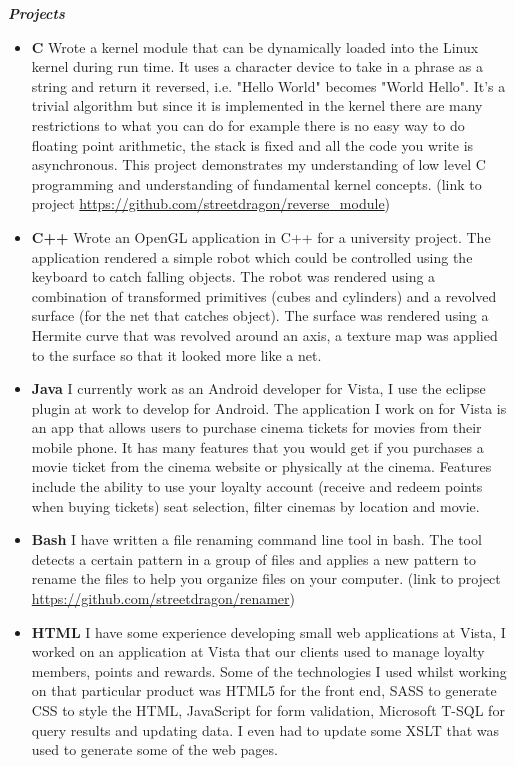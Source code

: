 \documentclass[margin=1cm]{res}
\begin{document}
\begin{resume}
{\sl \textbf{Projects}}
\begin{itemize}
        \item \textbf{C} Wrote a kernel module that can be dynamically loaded into the Linux kernel during run time. It uses a character device to take in a phrase as a string and return it reversed, i.e. "Hello World" becomes "World Hello". It's a trivial algorithm but since it is implemented in the kernel there are many restrictions to what you can do for example there is no easy way to do floating point arithmetic, the stack is fixed and all the code you write is asynchronous. This project demonstrates my understanding of low level C programming and understanding of fundamental kernel concepts. (link to project \href{https://github.com/streetdragon/reverse\_module}{https://github.com/streetdragon/reverse\_module}) 
        \item \textbf{C++} Wrote an OpenGL application in C++ for a university project. The application rendered a simple robot which could be controlled using the keyboard to catch falling objects. The robot was rendered using a combination of transformed primitives (cubes and cylinders) and a revolved surface (for the net that catches object). The surface was rendered using a Hermite curve that was revolved around an axis, a texture map was applied to the surface so that it looked more like a net.
        \item \textbf{Java} I currently work as an Android developer for Vista, I use the eclipse plugin at work to develop for Android. The application I work on for Vista is an app that allows users to purchase cinema tickets for movies from their mobile phone. It has many features that you would get if you purchases a movie ticket from the cinema website or physically at the cinema. Features include the ability to use your loyalty account (receive and redeem points when buying tickets) seat selection, filter cinemas by location and movie.
        \item \textbf{Bash} I have written a file renaming command line tool in bash. The tool detects a certain pattern in a group of files and applies a new pattern to rename the files to help you organize files on your computer. (link to project \href{https://github.com/streetdragon/renamer}{https://github.com/streetdragon/renamer})
        \item \textbf{HTML} I have some experience developing small web applications at Vista, I worked on an application at Vista that our clients used to manage loyalty members, points and rewards. Some of the technologies I used whilst working on that particular product was HTML5 for the front end, SASS to generate CSS to style the HTML, JavaScript for form validation, Microsoft T-SQL for query results and updating data. I even had to update some XSLT that was used to generate some of the web pages.
\end{itemize}
\end{resume} 
\end{document}
